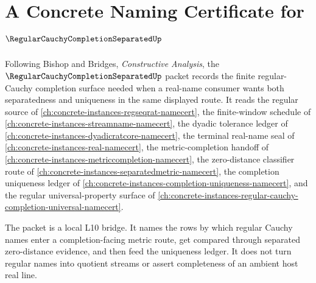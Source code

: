 \chapter{A Concrete Naming Certificate for $\RegularCauchyCompletionSeparatedUp$}
\label{ch:concrete-instances-regular-cauchy-completion-separated-namecert}

Following Bishop and Bridges, \emph{Constructive Analysis}, the $\RegularCauchyCompletionSeparatedUp$ packet records the finite regular-Cauchy completion surface needed when a real-name consumer wants both separatedness and uniqueness in the same displayed route. It reads the regular source of \autoref{ch:concrete-instances-regseqrat-namecert}, the finite-window schedule of \autoref{ch:concrete-instances-streamname-namecert}, the dyadic tolerance ledger of \autoref{ch:concrete-instances-dyadicratcore-namecert}, the terminal real-name seal of \autoref{ch:concrete-instances-real-namecert}, the metric-completion handoff of \autoref{ch:concrete-instances-metriccompletion-namecert}, the zero-distance classifier route of \autoref{ch:concrete-instances-separatedmetric-namecert}, the completion uniqueness ledger of \autoref{ch:concrete-instances-completion-uniqueness-namecert}, and the regular universal-property surface of \autoref{ch:concrete-instances-regular-cauchy-completion-universal-namecert}.

The packet is a local L10 bridge. It names the rows by which regular Cauchy names enter a completion-facing metric route, get compared through separated zero-distance evidence, and then feed the uniqueness ledger. It does not turn regular names into quotient streams or assert completeness of an ambient host real line.

